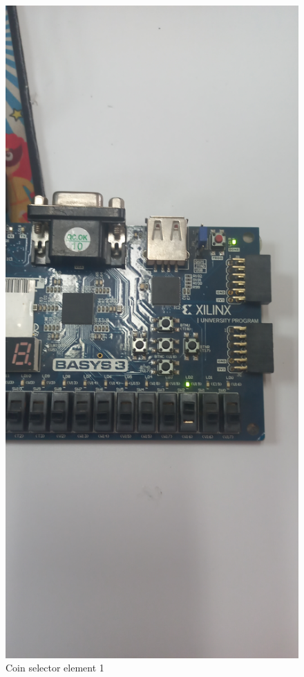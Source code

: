 \documentclass{article}
\begin{document}
\begin{multicols}{2}
	\begin{figure}[H]
		\centering
		\includegraphics[width=1\linewidth]{images/diagrams/coin-selector/coin-selector1.jpg}
		\caption{Coin selector element 1}
		\label{Coin selector element 1 Apendix}
	\end{figure}


\end{multicols}
\end{document}
